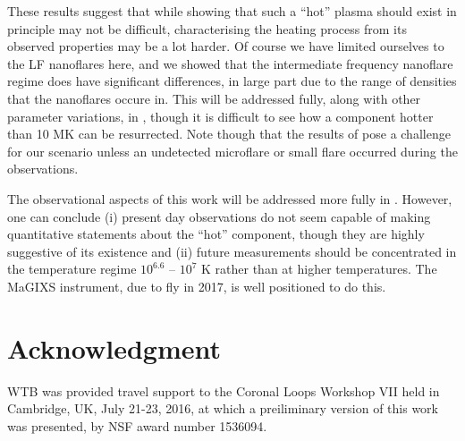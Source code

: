 \documentclass[apj]{emulateapj}
\begin{document}
%
\par These results suggest that while showing that such a ``hot'' plasma should exist in principle may not be difficult, characterising the heating process from its observed properties may be a lot harder. Of course we have limited ourselves to the LF nanoflares here, and we showed \citep{cargill_active_2014} that the intermediate frequency nanoflare regime does have significant differences, in large part due to the range of densities that the nanoflares occure in. This will be addressed fully, along with other parameter variations, in , though it is difficult to see how a component hotter than 10 MK can be resurrected. Note though that the results of \citet{caspi_new_2015} pose a challenge for our scenario unless an undetected microflare or small flare occurred during the observations.
	
	\par The observational aspects of this work will be addressed more fully in . However, one can conclude (i) present day observations do not seem capable of making quantitative statements about the ``hot'' component, though they are highly suggestive of its existence and (ii) future measurements should be concentrated in the temperature regime $10^{6.6}$ – $10^7$ K rather than at higher temperatures. The MaGIXS instrument, due to fly in 2017, is well positioned to do this.
%
\section*{Acknowledgment}
WTB was provided travel support to the Coronal Loops Workshop
VII held in Cambridge, UK, July 21-23, 2016, at which a preiliminary version of this work was presented, by NSF award number 1536094. 
	
	\appendix
\end{document}
